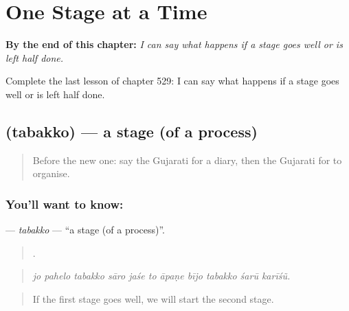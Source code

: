
\chapter{One Stage at a Time}
\label{ch:gu-one-stage-at-a-time}

\begin{chapteropening}
\textbf{By the end of this chapter:} \emph{I can say what happens if a stage goes well or is left half done.}

Complete the last lesson of chapter 529: I can say what happens if a stage goes well or is left half done.
\end{chapteropening}

\section[\texorpdfstring{\gu{તબક્કો} (tabakko)}{તબક્કો (tabakko)}]{ (tabakko) — a stage (of a process)}

\label{lesson:GU-C529-tabakko}



\begin{quote}
Before the new one: say the Gujarati for a diary, then the Gujarati for to organise.
\end{quote}

\subsection*{You'll want to know: }
\textbf{} — \emph{tabakko} — \textquotedblleft{}a stage (of a process)\textquotedblright{}.

\begin{quote}
          .
\end{quote}

\begin{quote}
\emph{jo pahelo tabakko sāro jaśe to āpaṇe bījo tabakko śarū karīśũ.}
\end{quote}

\begin{quote}
If the first stage goes well, we will start the second stage.
\end{quote}

